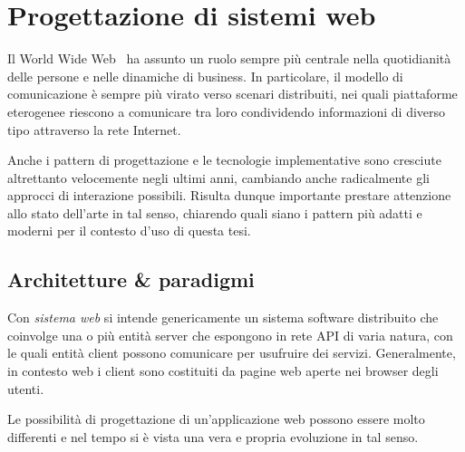 \chapter{Progettazione di sistemi web}\label{ch:web}
  Il World Wide Web~\cite{Berners_Lee_2010} ha assunto un ruolo sempre più centrale nella quotidianità delle persone e nelle dinamiche di business.
  In particolare, il modello di comunicazione è sempre più virato verso scenari distribuiti,
  nei quali piattaforme eterogenee riescono a comunicare tra loro condividendo informazioni di diverso tipo attraverso la rete Internet.

  Anche i pattern di progettazione e le tecnologie implementative sono cresciute altrettanto velocemente negli ultimi anni, cambiando anche radicalmente gli approcci di interazione possibili.
  Risulta dunque importante prestare attenzione allo stato dell'arte in tal senso, chiarendo quali siano i pattern più adatti e moderni per il contesto d'uso di questa tesi.

  \section{Architetture \& paradigmi}\label{sec:web-architecture}

  Con \emph{sistema web} si intende genericamente un sistema software distribuito che coinvolge una o più entità server che espongono in rete API di varia natura, con le quali entità client possono comunicare per usufruire dei servizi.
  Generalmente, in contesto web i client sono costituiti da pagine web aperte nei browser degli utenti.

  Le possibilità di progettazione di un'applicazione web possono essere molto differenti e nel tempo si è vista una vera e propria evoluzione in tal senso.

